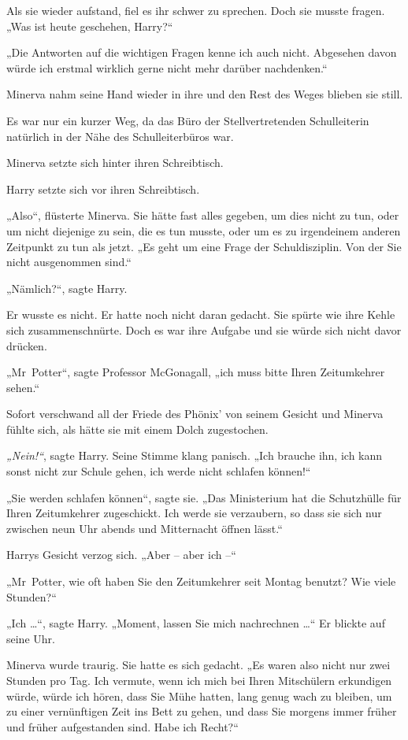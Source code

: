 Als sie wieder aufstand, fiel es ihr schwer zu sprechen. Doch sie musste fragen. „Was ist heute geschehen, Harry?“ 

„Die Antworten auf die wichtigen Fragen kenne ich auch nicht. Abgesehen davon würde ich erstmal wirklich gerne nicht mehr darüber nachdenken.“ 

Minerva nahm seine Hand wieder in ihre und den Rest des Weges blieben sie still. 

Es war nur ein kurzer Weg, da das Büro der Stellvertretenden Schulleiterin natürlich in der Nähe des Schulleiterbüros war. 

Minerva setzte sich hinter ihren Schreibtisch. 

Harry setzte sich vor ihren Schreibtisch. 

„Also“, flüsterte Minerva. Sie hätte fast alles gegeben, um dies nicht zu tun, oder um nicht diejenige zu sein, die es tun musste, oder um es zu irgendeinem anderen Zeitpunkt zu tun als jetzt. „Es geht um eine Frage der Schuldisziplin. Von der Sie nicht ausgenommen sind.“ 

„Nämlich?“, sagte Harry. 

Er wusste es nicht. Er hatte noch nicht daran gedacht. Sie spürte wie ihre Kehle sich zusammenschnürte. Doch es war ihre Aufgabe und sie würde sich nicht davor drücken. 

„Mr~Potter“, sagte Professor McGonagall, „ich muss bitte Ihren Zeitumkehrer sehen.“ 

Sofort verschwand all der Friede des Phönix’ von seinem Gesicht und Minerva fühlte sich, als hätte sie mit einem Dolch zugestochen. 

\emph{„Nein!“}, sagte Harry. Seine Stimme klang panisch. „Ich brauche ihn, ich kann sonst nicht zur Schule gehen, ich werde nicht schlafen können!“ 

„Sie werden schlafen können“, sagte sie. „Das Ministerium hat die Schutzhülle für Ihren Zeitumkehrer zugeschickt. Ich werde sie verzaubern, so dass sie sich nur zwischen neun Uhr abends und Mitternacht öffnen lässt.“ 

Harrys Gesicht verzog sich. „Aber – aber ich –“ 

„Mr~Potter, wie oft haben Sie den Zeitumkehrer seit Montag benutzt? Wie viele Stunden?“ 

„Ich …“, sagte Harry. „Moment, lassen Sie mich nachrechnen …“ Er blickte auf seine Uhr. 

Minerva wurde traurig. Sie hatte es sich gedacht. „Es waren also nicht nur zwei Stunden pro Tag. Ich vermute, wenn ich mich bei Ihren Mitschülern erkundigen würde, würde ich hören, dass Sie Mühe hatten, lang genug wach zu bleiben, um zu einer vernünftigen Zeit ins Bett zu gehen, und dass Sie morgens immer früher und früher aufgestanden sind. Habe ich Recht?“ 

